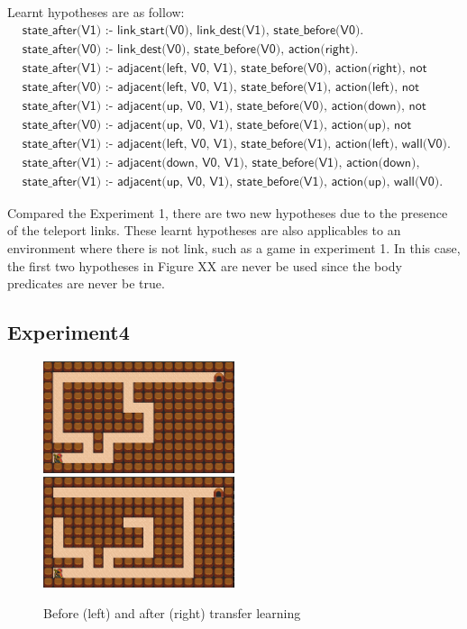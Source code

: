 Learnt hypotheses are as follow:
\begin{equation*}
\begin{split}
&\textsf{state\_after(V1) :- link\_start(V0), link\_dest(V1), state\_before(V0).}\\
&\textsf{state\_after(V0) :- link\_dest(V0), state\_before(V0), action(right).}\\
&\textsf{state\_after(V1) :- adjacent(left, V0, V1), state\_before(V0), action(right), not wall(V1).}\\
&\textsf{state\_after(V0) :- adjacent(left, V0, V1), state\_before(V1), action(left), not wall(V0).}\\
&\textsf{state\_after(V1) :- adjacent(up, V0, V1), state\_before(V0), action(down), not wall(V1).}\\
&\textsf{state\_after(V0) :- adjacent(up, V0, V1), state\_before(V1), action(up), not wall(V0).}\\
&\textsf{state\_after(V1) :- adjacent(left, V0, V1), state\_before(V1), action(left), wall(V0).}\\
&\textsf{state\_after(V1) :- adjacent(down, V0, V1), state\_before(V1), action(down), wall(V0).}\\
&\textsf{state\_after(V1) :- adjacent(up, V0, V1), state\_before(V1), action(up), wall(V0).}
\end{split}
\end{equation*}

Compared the Experiment 1, there are two new hypotheses due to the presence of the teleport links. 
These learnt hypotheses are also applicables to an environment where there is not link, such as a game in experiment 1.
In this case, the first two hypotheses in Figure XX are never be used since the body predicates are never be true. 

\newpage

\subsection{Experiment4}

\begin{figure}[!htb]
\centerline{
\includegraphics[width=0.5\textwidth]{./figures/experiment4_before}
\includegraphics[width=0.5\textwidth]{./figures/experiment4_after}
}
\caption{Before (left) and after (right) transfer learning}
\label{experiment4}
\end{figure}

